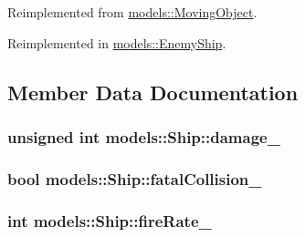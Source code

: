 \-Reimplemented from \hyperlink{classmodels_1_1MovingObject_a452872617ed6b1a334bfed4efcd5d3a0}{models\-::\-Moving\-Object}.



\-Reimplemented in \hyperlink{classmodels_1_1EnemyShip_aa25f4cfb211186150ac3b229722b07ae}{models\-::\-Enemy\-Ship}.



\subsection{\-Member \-Data \-Documentation}
\hypertarget{classmodels_1_1Ship_a41dd819c1d1c044f8ca84f21cd0a7fd1}{
\subsubsection[{damage\-\_\-}]{\setlength{\rightskip}{0pt plus 5cm}unsigned int {\bf models\-::\-Ship\-::damage\-\_\-}}}\label{d0/d37/classmodels_1_1Ship_a41dd819c1d1c044f8ca84f21cd0a7fd1}
\hypertarget{classmodels_1_1Ship_a8b88697951b82f60dacfd9fac6e38f0e}{
\subsubsection[{fatal\-Collision\-\_\-}]{\setlength{\rightskip}{0pt plus 5cm}bool {\bf models\-::\-Ship\-::fatal\-Collision\-\_\-}}}\label{d0/d37/classmodels_1_1Ship_a8b88697951b82f60dacfd9fac6e38f0e}
\hypertarget{classmodels_1_1Ship_a4dcc94b7be2dc539754dbbd2e67e6f74}{
\subsubsection[{fire\-Rate\-\_\-}]{\setlength{\rightskip}{0pt plus 5cm}int {\bf models\-::\-Ship\-::fire\-Rate\-\_\-}}}\label{d0/d37/classmodels_1_1Ship_a4dcc94b7be2dc539754dbbd2e67e6f74}
